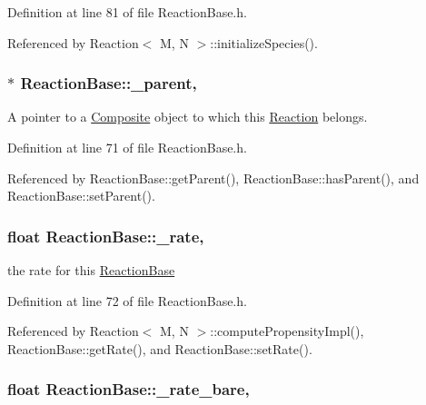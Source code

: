 Definition at line 81 of file Reaction\+Base.\+h.



Referenced by Reaction$<$ M, N $>$\+::initialize\+Species().

\hypertarget{classReactionBase_a7ad71ef8d77e5ad85be9126f4f4f4b70}{
\subsubsection[{\+\_\+parent}]{$\ast$ Reaction\+Base\+::\+\_\+parent\hspace{0.3cm}{\ttfamily [protected]}, {\ttfamily [inherited]}}}\label{classReactionBase_a7ad71ef8d77e5ad85be9126f4f4f4b70}


A pointer to a \hyperlink{classComposite}{Composite} object to which this \hyperlink{classReaction}{Reaction} belongs. 



Definition at line 71 of file Reaction\+Base.\+h.



Referenced by Reaction\+Base\+::get\+Parent(), Reaction\+Base\+::has\+Parent(), and Reaction\+Base\+::set\+Parent().

\hypertarget{classReactionBase_a6eea78021fc01eecae6666edc0532e44}{
\subsubsection[{\+\_\+rate}]{\setlength{\rightskip}{0pt plus 5cm}float Reaction\+Base\+::\+\_\+rate\hspace{0.3cm}{\ttfamily [protected]}, {\ttfamily [inherited]}}}\label{classReactionBase_a6eea78021fc01eecae6666edc0532e44}


the rate for this \hyperlink{classReactionBase}{Reaction\+Base} 



Definition at line 72 of file Reaction\+Base.\+h.



Referenced by Reaction$<$ M, N $>$\+::compute\+Propensity\+Impl(), Reaction\+Base\+::get\+Rate(), and Reaction\+Base\+::set\+Rate().

\hypertarget{classReactionBase_a7622cb447ce421d7d062d6bab1105aea}{
\subsubsection[{\+\_\+rate\+\_\+bare}]{\setlength{\rightskip}{0pt plus 5cm}float Reaction\+Base\+::\+\_\+rate\+\_\+bare\hspace{0.3cm}{\ttfamily [protected]}, {\ttfamily [inherited]}}}\label{classReactionBase_a7622cb447ce421d7d062d6bab1105aea}


